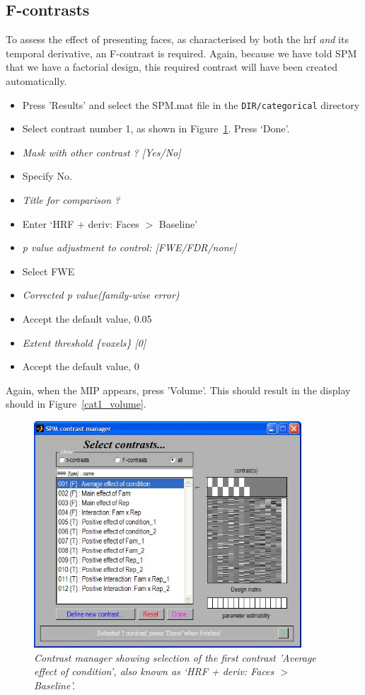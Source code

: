 \documentclass[a4paper,titlepage]{book}
\newcommand{\bi}{\begin{itemize}}
\newcommand{\ei}{\end{itemize}}
\begin{document}
\subsection{F-contrasts}

To assess the effect of presenting faces, as characterised by both the hrf {\em and} its temporal derivative, an F-contrast is required. Again, because we have told SPM that we have a factorial design, this required contrast will have been created automatically. 
\bi
\item{Press 'Results' and select the SPM.mat file in the 
\verb!DIR/categorical! directory}
\item{Select contrast number 1, as shown in Figure~\ref{cat1_contrast}. Press `Done'.}
\item{\em Mask with other contrast ? [Yes/No]}
\item{Specify No.}
\item{\em Title for comparison ?}
\item{Enter `HRF + deriv: Faces $>$ Baseline'}
\item{\em p value adjustment to control: [FWE/FDR/none]}
\item{Select FWE}
\item{\em Corrected p value(family-wise error)}
\item{Accept the default value, 0.05}
\item{\em Extent threshold \{voxels\} [0]}
\item{Accept the default value, 0}
\ei
Again, when the MIP appears, press 'Volume'. This should result in the display should in Figure~\ref{cat1_volume}.
\begin{figure}
\begin{center}
\includegraphics[width=100mm]{cat1_contrast}
\caption{\em Contrast manager showing selection of the first contrast 'Average effect of condition', also known as `HRF + deriv: Faces  $>$ Baseline'. \label{cat1_contrast} }
\end{center}
\end{figure}
\end{document}
